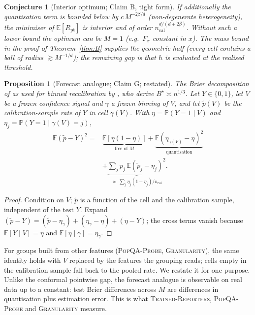 \documentclass[11pt]{article}
\newtheorem{proposition}[theorem]{Proposition}
\newtheorem{conjecture}[theorem]{Conjecture}
\theoremstyle{definition}
\theoremstyle{remark}
\newcommand{\E}{\mathbb{E}}
\renewcommand{\P}{\mathbb{P}}
\newcommand{\1}{\mathbf{1}}
\newcommand{\expname}[1]{\textsc{#1}}
\begin{document}
\begin{conjecture}[Interior optimum; Claim B, tight form]
\label{conj:B}
If additionally the quantisation term is bounded \emph{below} by $c\,M^{-2\beta/d}$
(non-degenerate heterogeneity), the minimiser of $\E[R_{\mathrm{pt}}]$ is interior and of
order $n_{\mathrm{cal}}^{d/(d+2\beta)}$. Without such a lower bound the optimum can be $M=1$
(e.g.\ $F_x$ constant in $x$). The mass bound in the proof of Theorem~\ref{thm:B} supplies the
geometric half (every cell contains a ball of radius $\gtrsim M^{-1/d}$); the remaining gap is
that $h$ is evaluated at the realised threshold.
\end{conjecture}

\begin{proposition}[Forecast analogue; Claim G; restated]
\label{prop:G}
The Brier decomposition of \citet{murphy1973new} as used for binned recalibration by
\citet{sun2023minimum}, who derive $B^\star\asymp n^{1/3}$. Let $Y\in\{0,1\}$, let $V$ be a frozen confidence signal and $\gamma$ a frozen binning of
$V$, and let $\tilde p(V)$ be the calibration-sample rate of $Y$ in cell $\gamma(V)$. With
$\eta=\P(Y=1\mid V)$ and $\eta_j=\P(Y=1\mid\gamma(V)=j)$,
\begin{align*}
  \E(\tilde p-Y)^2 = {}&\underbrace{\E[\eta(1-\eta)]}_{\text{free of }M}
  + \underbrace{\E(\eta_{\gamma(V)}-\eta)^2}_{\text{quantisation}}\\
  &+ \underbrace{\textstyle\sum_j p_j\,\E(\tilde p_j-\eta_j)^2}_{\approx\ \sum_j \eta_j(1-\eta_j)/n_{\mathrm{cal}}}.
\end{align*}
\end{proposition}
\begin{proof}
Condition on $V$; $\tilde p$ is a function of the cell and the calibration sample, independent of
the test $Y$. Expand $(\tilde p-Y)=(\tilde p-\eta_{\gamma})+(\eta_\gamma-\eta)+(\eta-Y)$; the cross
terms vanish because $\E[Y\mid V]=\eta$ and $\E[\eta\mid\gamma]=\eta_\gamma$.
\end{proof}
For groups built from other features (\expname{PopQA-Probe}, \expname{Granularity}), the same identity holds with $V$ replaced by
the features the grouping reads; cells empty in the calibration sample fall back to the pooled
rate. We restate it for one purpose. Unlike the conformal pointwise gap, the forecast analogue is
observable on real data up to a constant: test Brier differences across $M$ are differences in quantisation plus estimation
error. This is what \expname{Trained-Reporters}, \expname{PopQA-Probe} and \expname{Granularity} measure.
\end{document}
